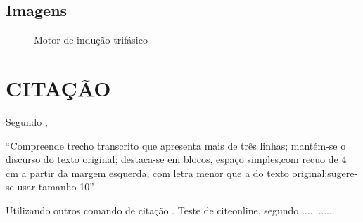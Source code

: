 \subsection{Imagens}


\begin{figure}[!htpb]
	\centering
	\caption{Motor de indução trifásico}
	\label{fig:Motores}
\end{figure}

\section{CITAÇÃO}

Segundo  ,
\begin{citacao}
	``Compreende trecho transcrito que apresenta mais de três linhas; mantém-se o discurso do texto original; destaca-se em blocos, espaço simples,com recuo de 4 cm a partir da margem esquerda, com letra menor que a do texto original;sugere-se usar tamanho 10''.
\end{citacao}

Utilizando outros comando de citação \cite{fitzgerald2014}. Teste de citeonline, segundo ............
